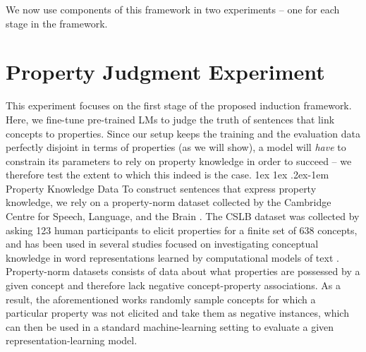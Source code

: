 \documentclass[10pt,letterpaper]{article}
\makeatletter
\renewcommand{\paragraph}{%
  \@startsection{paragraph}{4}%
  {\z@}{1ex \@plus 1ex \@minus .2ex}{-1em}%
  {\normalfont\normalsize\bfseries}%
}
\makeatother
\begin{document}
We now use components of this framework in two experiments -- one for each stage in the framework.

\section{Property Judgment Experiment}
This experiment focuses on the first stage of the proposed induction framework. Here, we fine-tune pre-trained LMs to judge the truth of sentences that link concepts to properties. 
Since our setup keeps the training and the evaluation data perfectly disjoint in terms of properties (as we will show), a model will \textit{have} to constrain its parameters to rely on property knowledge in order to succeed -- we therefore test the extent to which this indeed is the case. 
\paragraph{Property Knowledge Data}
To construct sentences that express property knowledge, we rely on a property-norm dataset collected by the Cambridge Centre for Speech, Language, and the Brain \citep[CSLB;][]{devereux2014centre}.
The CSLB dataset was collected by asking 123     human participants to elicit properties for a finite set of 638 concepts, and has been used in several
studies focused on investigating conceptual knowledge in word representations learned by computational models of text \citep[e.g., ][]{lucy-gauthier-2017-distributional, da-kasai-2019-cracking, bhatia2020transformer}.
Property-norm datasets consists of data about what properties are possessed by a given concept and therefore lack negative concept-property associations. 
As a result, the aforementioned works randomly sample concepts for which a particular property was not elicited and take them as negative instances, which can then be used in a standard machine-learning setting to evaluate a given representation-learning model.
\end{document}
